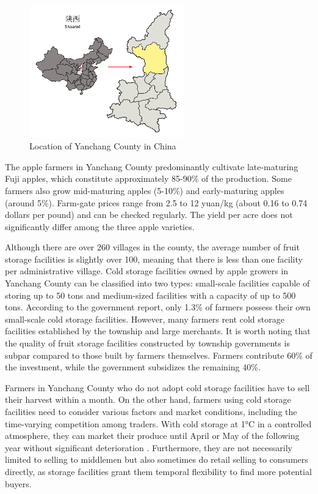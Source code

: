 \documentclass[12pt]{article}
\begin{document}
\begin{figure}[thp]
\centering
\includegraphics[width=0.6\textwidth]{figures/yanchang_map.png}
\caption{Location of Yanchang County in China}
\label{Figure: Yanchang}
\end{figure}

The apple farmers in Yanchang County predominantly cultivate late-maturing Fuji apples, which constitute approximately 85-90\% of the production. Some farmers also grow mid-maturing apples (5-10\%) and early-maturing apples (around 5\%). Farm-gate prices range from 2.5 to 12 yuan/kg (about 0.16 to 0.74 dollars per pound) and can be checked regularly. The yield per acre does not significantly differ among the three apple varieties.

Although there are over 260 villages in the county, the average number of fruit storage facilities is slightly over 100, meaning that there is less than one facility per administrative village. Cold storage facilities owned by apple growers in Yanchang County can be classified into two types: small-scale facilities capable of storing up to 50 tons and medium-sized facilities with a capacity of up to 500 tons. According to the government report, only 1.3\% of farmers possess their own small-scale cold storage facilities. However, many farmers rent cold storage facilities established by the township and large merchants. It is worth noting that the quality of fruit storage facilities constructed by township governments is subpar compared to those built by farmers themselves. Farmers contribute 60\% of the investment, while the government subsidizes the remaining 40\%.

Farmers in Yanchang County who do not adopt cold storage facilities have to sell their harvest within a month. On the other hand, farmers using cold storage facilities need to consider various factors and market conditions, including the time-varying competition among traders. With cold storage at 1°C in a controlled atmosphere, they can market their produce until April or May of the following year without significant deterioration \citep{Varela2005Shelf-life, Echeverría2004Relationships}. Furthermore, they are not necessarily limited to selling to middlemen but also sometimes do retail selling to consumers directly, as storage facilities grant them temporal flexibility to find more potential buyers.
\end{document}
